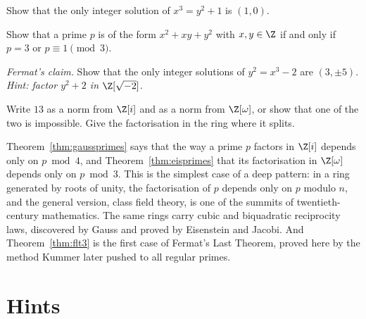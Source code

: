\begin{exercise}[$\star\star$]\label{ex:x3y21}
Show that the only integer solution of $x^3=y^2+1$ is $(1,0)$.
\end{exercise}

\begin{exercise}[$\star\star$]\label{ex:xxyy}
Show that a prime $p$ is of the form $x^2+xy+y^2$ with $x,y\in\Z$ if and only if $p=3$ or $p\equiv1\pmod3$.
\end{exercise}

\begin{exercise}[$\star\star\star$]\label{ex:y2x3m2}
\emph{Fermat's claim.} Show that the only integer solutions of $y^2=x^3-2$ are $(3,\pm5)$. \emph{Hint: factor $y^2+2$ in $\Z[\sqrt{-2}]$.}
\end{exercise}

\begin{exercise}[$\star$]\label{ex:t1-split13}
Write $13$ as a norm from $\Z[i]$ and as a norm from $\Z[\omega]$, or show that one of the two is impossible. Give the factorisation in the ring where it splits.
\end{exercise}

\begin{beauty}
Theorem~\ref{thm:gaussprimes} says that the way a prime $p$ factors in $\Z[i]$ depends only on $p\bmod4$, and Theorem~\ref{thm:eisprimes} that its factorisation in $\Z[\omega]$ depends only on $p\bmod3$. This is the simplest case of a deep pattern: in a ring generated by roots of unity, the factorisation of $p$ depends only on $p$ modulo $n$, and the general version, class field theory, is one of the summits of twentieth-century mathematics. The same rings carry cubic and biquadratic reciprocity laws, discovered by Gauss and proved by Eisenstein and Jacobi. And Theorem~\ref{thm:flt3} is the first case of Fermat's Last Theorem, proved here by the method Kummer later pushed to all regular primes.
\end{beauty}

\section{Hints}

